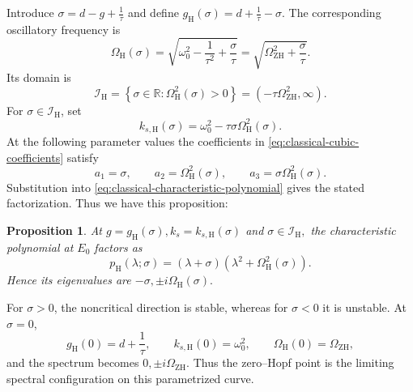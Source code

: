 \documentclass[11pt,reqno]{amsart}
\theoremstyle{plain}
\newtheorem{proposition}[theorem]{Proposition}
\theoremstyle{definition}
\theoremstyle{remark}
\begin{document}
Introduce
$
\sigma=d-g+\frac1\tau
$
and define
$
g_{\mathrm H}(\sigma)=d+\frac1\tau-\sigma.
$
The corresponding oscillatory frequency is
\begin{equation}
\label{eq:classical-Hopf-frequency}
\Omega_{\mathrm H}(\sigma)
=
\sqrt{\omega_0^2-\frac1{\tau^2}+\frac{\sigma}{\tau}}
=
\sqrt{\Omega_{\mathrm{ZH}}^2+\frac{\sigma}{\tau}}.
\end{equation}
Its domain is
\begin{equation}
\label{eq:classical-Hopf-sigma-domain}
\mathcal I_{\mathrm H}
=
\left\{\sigma\in\mathbb R:
\Omega_{\mathrm H}^2(\sigma)>0\right\}
=
\left(-\tau\Omega_{\mathrm{ZH}}^2,\infty\right).
\end{equation}
For $\sigma\in\mathcal I_{\mathrm H}$, set
\begin{equation}
\label{eq:classical-Hopf-stiffness}
k_{s,\mathrm H}(\sigma)
=
\omega_0^2-\tau\sigma\Omega_{\mathrm H}^2(\sigma).
\end{equation}
At the following parameter values the coefficients in
\eqref{eq:classical-cubic-coefficients} satisfy
\[
a_1=\sigma,\qquad
a_2=\Omega_{\mathrm H}^2(\sigma),\qquad
a_3=\sigma\Omega_{\mathrm H}^2(\sigma).
\]
Substitution into
\eqref{eq:classical-characteristic-polynomial} gives the stated
factorization. Thus we have this proposition:

\begin{proposition}
\label{prop:classical-Hopf-spectral-parametrization}
At
$
g=g_{\mathrm H}(\sigma),
k_s=k_{s,\mathrm H}(\sigma)$ and 
 $\sigma\in\mathcal I_{\mathrm H},
$
the characteristic polynomial at $E_0$ factors as
\[
p_{\mathrm H}(\lambda;\sigma)
=
(\lambda+\sigma)
\left(\lambda^2+\Omega_{\mathrm H}^2(\sigma)\right).
\]
Hence its eigenvalues are
$
-\sigma,
\pm i\Omega_{\mathrm H}(\sigma).
$
\end{proposition}
For $\sigma>0$, the noncritical direction is stable, whereas for
$\sigma<0$ it is unstable. At $\sigma=0$,
\[
g_{\mathrm H}(0)=d+\frac1\tau,\qquad
k_{s,\mathrm H}(0)=\omega_0^2,\qquad
\Omega_{\mathrm H}(0)=\Omega_{\mathrm{ZH}},
\]
and the spectrum becomes $0,\pm i\Omega_{\mathrm{ZH}}$.
Thus the zero--Hopf point is the limiting spectral configuration
on this parametrized curve.

\end{document}
